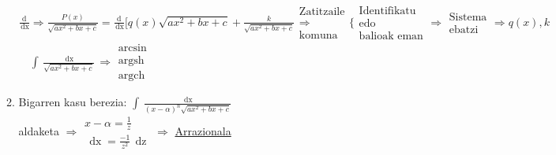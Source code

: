 \documentclass[8pt]{article}
\DeclareMathOperator{\xder}{\, \mathrm{d}x}
\DeclareMathOperator{\zder}{\, \mathrm{d}z}
\DeclareMathOperator{\argsh}{argsh}
\DeclareMathOperator{\argch}{argch}
\begin{document}
\begin{itemize}
\begin{enumerate}
						$ \frac{\mathrm{d}}{\xder} \Rightarrow 
						\frac{P(x)}{\sqrt{a x^2 + bx + c}} = 
						\frac{\mathrm{d}}{\xder}
						[q(x) \sqrt{a x^2 + bx + c} + \frac{k}{\sqrt{a x^2 + bx + c}}
						\begin{array}{c}
							\text{Zatitzaile}\\
							\Rightarrow\\
							\text{komuna}
						\end{array}
						\Bigg \{
						\begin{array}{c}
							\text{Identifikatu}\\
							\text{edo}\\
							\text{balioak eman}
						\end{array}
						\Rightarrow
						\begin{array}{c}
							\text{Sistema}\\
							\text{ebatzi}
						\end{array} \Rightarrow q(x), k $
						$ \quad \int \frac{\xder}{\sqrt{a x^2 + bx + c}}
						\Rightarrow
						\begin{array}{c}
							\arcsin\\
							\argsh\\
							\argch
						\end{array} $
					\item Bigarren kasu berezia:
						$ \int \frac{\xder}{(x - \alpha)^n \sqrt{a x^2 + bx + c}} $\\
						aldaketa $ \Rightarrow 
						\begin{array}{c}
							x - \alpha = \frac{1}{z}\\
							\xder = \frac{-1}{z^2} \zder
						\end{array}
						\Rightarrow $ \underline{Arrazionala}
				\end{enumerate}
		\end{itemize}
\end{document}
